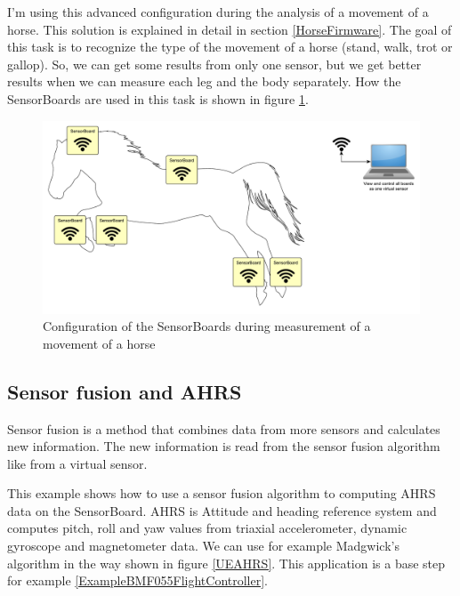 I'm using this advanced configuration during the analysis of a movement of a horse. This solution is explained in detail in section \ref{HorseFirmware}. The goal of this task is to recognize the type of the movement of a horse (stand, walk, trot or gallop). So, we can get some results from only one sensor, but we get better results when we can measure each leg and the body separately. How the SensorBoards are used in this task is shown in figure \ref{UELoggingHorse}.

\begin{figure}
	\centering
	\label{UELoggingHorse}
	\caption{Configuration of the SensorBoards during measurement of a movement of a horse}
	\includegraphics[width=\linewidth]{img/UsageExamplesLoggerHorse.pdf}
\end{figure}

\subsection{Sensor fusion and \ac{AHRS}}
\label{ExampleAHRS}
Sensor fusion is a method that combines data from more sensors and calculates new information. The new information is read from the sensor fusion algorithm like from a virtual sensor. \cite{SensorFusion}

This example shows how to use a sensor fusion algorithm to computing \ac{AHRS} data on the SensorBoard. \ac{AHRS} is Attitude and heading reference system and computes pitch, roll and yaw values from triaxial accelerometer, dynamic gyroscope and magnetometer data. We can use for example Madgwick's algorithm \cite{MadgwickAHRS} in the way shown in figure \ref{UEAHRS}. This application is a base step for example \ref{ExampleBMF055FlightController}.

